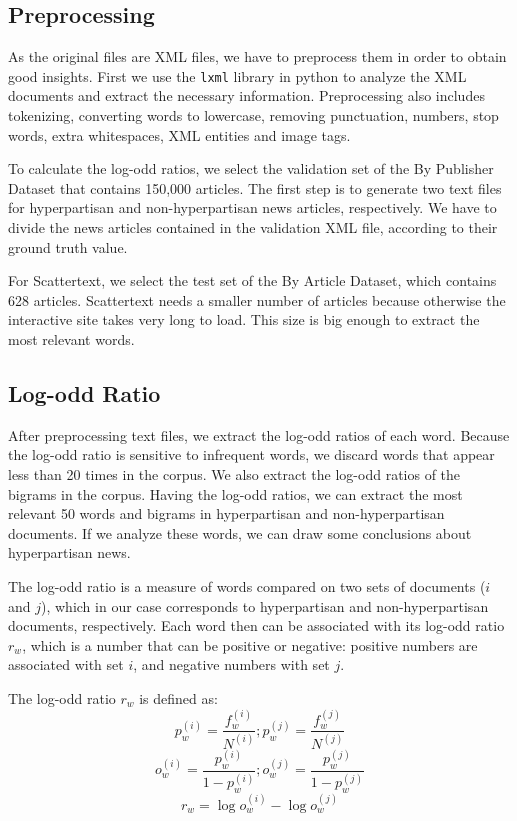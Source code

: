 \documentclass[11pt,a4paper]{article}
\begin{document}
\subsection{Preprocessing}
\label{Preprocessing}
As the original files are XML files, we have to preprocess them in order to obtain good insights. First we use the \texttt{lxml} library in python to analyze the XML documents and extract the necessary information. Preprocessing also includes tokenizing, converting words to lowercase, removing punctuation, numbers, stop words, extra whitespaces, XML entities and image tags.

To calculate the log-odd ratios, we select the validation set of the By Publisher Dataset that contains 150,000 articles. The first step is to generate two text files for hyperpartisan and non-hyperpartisan news articles, respectively. We have to divide the news articles contained in the validation XML file, according to their ground truth value.

For Scattertext, we select the test set of the By Article Dataset, which contains 628 articles. Scattertext needs a smaller number of articles because otherwise the interactive site takes very long to load. This size is big enough to extract the most relevant words.

\subsection{Log-odd Ratio}

After preprocessing text files, we extract the log-odd ratios of each word. Because the log-odd ratio is sensitive to infrequent words, we discard words that appear less than 20 times in the corpus. We also extract the log-odd ratios of the bigrams in the corpus. Having the log-odd ratios, we can extract the most relevant 50 words and bigrams in hyperpartisan and non-hyperpartisan documents. If we analyze these words, we can draw some conclusions about hyperpartisan news.

The log-odd ratio is a measure of words compared on two sets of documents ($i$ and $j$), which in our case corresponds to hyperpartisan and non-hyperpartisan documents, respectively. Each word then can be associated with its log-odd ratio $r_w$, which is a number that can be positive or negative: positive numbers are associated with set $i$, and negative numbers with set $j$.

The log-odd ratio $r_w$ is defined as:
$$p_w^{(i)} = \frac{f_w^{(i)}}{N^{(i)}}; p_w^{(j)} = \frac{f_w^{(j)}}{N^{(j)}}$$
$$o_w^{(i)} = \frac{p_w^{(i)}}{1-p_w^{(i)}}; o_w^{(j)} = \frac{p_w^{(j)}}{1-p_w^{(j)}}$$
$$r_w = \log{o_w^{(i)}} - \log{o_w^{(j)}}$$
\end{document}
